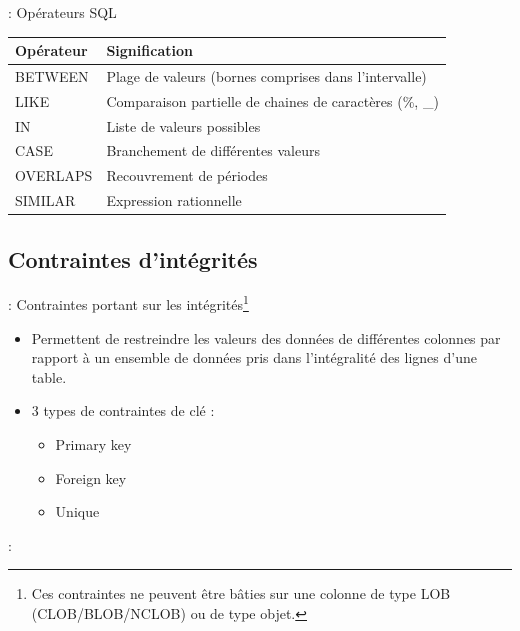 \documentclass[10pt]{beamer}
\begin{document}
\begin{frame}{\secname : \subsecname}
    Opérateurs SQL
    \begin{table}[]
        \begin{tabular}{|l|l|}
            \hline
            {Opérateur} & {Signification}                                           \\ \hline
            {BETWEEN}   & {Plage de valeurs (bornes comprises dans l'intervalle)}   \\ \hline
            {LIKE}      & {Comparaison partielle de chaines de caractères (\%, \_)} \\ \hline
            {IN}        & {Liste de valeurs possibles}                              \\ \hline
            {CASE}      & {Branchement de différentes valeurs}                      \\ \hline
            {OVERLAPS}  & {Recouvrement de périodes}                                \\ \hline
            {SIMILAR}   & {Expression rationnelle}                                  \\ \hline
        \end{tabular}
    \end{table}
\end{frame}
\subsection{Contraintes d'intégrités}
\begin{frame}{\secname : \subsecname}
    Contraintes portant sur les intégrités\footnote{Ces contraintes ne peuvent être bâties sur une colonne de type LOB (CLOB/BLOB/NCLOB) ou de type objet.}
    \begin{itemize}
        \item Permettent de restreindre les valeurs des données de différentes colonnes par rapport à un ensemble de données pris dans l'intégralité des lignes d'une table.
        \item 3 types de contraintes de clé :
              \begin{itemize}
                  \item Primary key
                  \item Foreign key
                  \item Unique
              \end{itemize}
    \end{itemize}
\end{frame}
\begin{frame}{\secname : \subsecname}
    
    
\end{frame}
\end{document}
